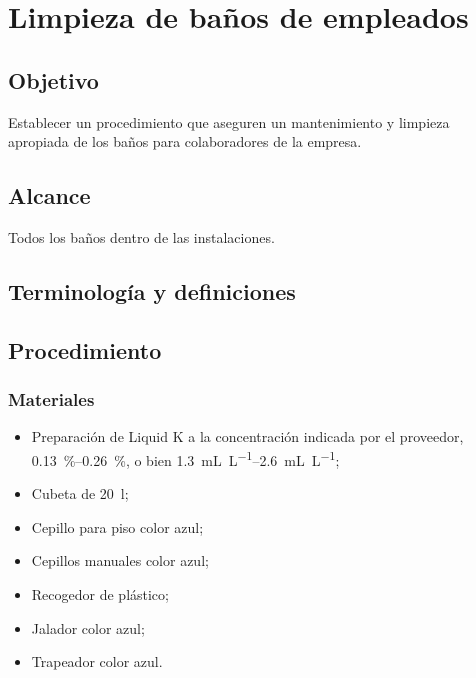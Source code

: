 \thispagestyle{formato-PI}
\renewcommand{\MenorVer}{0}
\renewcommand{\MayorVer}{2}
\renewcommand{\Codigo}{HYS-16-IT}
\renewcommand{\FechaPub}{2023--01}
\renewcommand{\Titulo}{Limpieza de baños de empleados}

\section{\Titulo}

\subsection{Objetivo}
Establecer un procedimiento que aseguren un mantenimiento y limpieza apropiada de los baños para colaboradores de la empresa.

\subsection{Alcance}

Todos los baños dentro de las instalaciones.

\subsection{Terminología y definiciones}

\begin{description}
\end{description}



\subsection{Procedimiento}

\subsubsection{Materiales}

\begin{itemize}
	\item Preparación de Liquid K a la concentración indicada por el proveedor, \qtyrange{.13}{.26}{\percent}, o bien \qtyrange{1.3}{2.6}{\milli\liter\per\liter};
	\item Cubeta de \qty{20}{\litre};
	\item Cepillo para piso color azul;
	\item Cepillos manuales color azul;
	\item Recogedor de plástico;
	\item Jalador color azul;
	\item Trapeador color azul.
\end{itemize}

